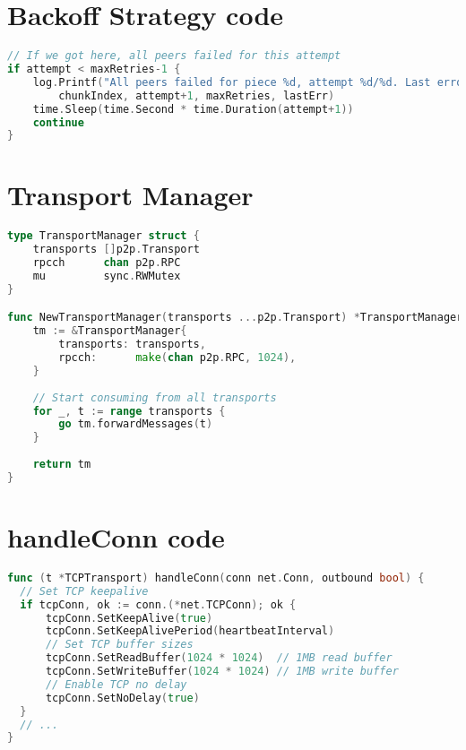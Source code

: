 \documentclass[12pt,a4paper]{report}
\begin{document}
\section{Backoff Strategy code}
\begin{lstlisting}[language=Go, caption={Backoff strategy implementation}, label={lst:backoff-strategy}]
// If we got here, all peers failed for this attempt
if attempt < maxRetries-1 {
    log.Printf("All peers failed for piece %d, attempt %d/%d. Last error: %v",
        chunkIndex, attempt+1, maxRetries, lastErr)
    time.Sleep(time.Second * time.Duration(attempt+1))
    continue
}
\end{lstlisting}

\section{Transport Manager}
\begin{lstlisting}[language=Go, caption={Transport Manager implementation}, label={lst:transport-manager}]
type TransportManager struct {
    transports []p2p.Transport
    rpcch      chan p2p.RPC
    mu         sync.RWMutex
}

func NewTransportManager(transports ...p2p.Transport) *TransportManager {
    tm := &TransportManager{
        transports: transports,
        rpcch:      make(chan p2p.RPC, 1024),
    }
    
    // Start consuming from all transports
    for _, t := range transports {
        go tm.forwardMessages(t)
    }
    
    return tm
}
\end{lstlisting}

\section{handleConn code}
\begin{lstlisting}[language=Go, caption={handleConn optimisations}, label={lst:handleConn}]
func (t *TCPTransport) handleConn(conn net.Conn, outbound bool) {
  // Set TCP keepalive
  if tcpConn, ok := conn.(*net.TCPConn); ok {
      tcpConn.SetKeepAlive(true)
      tcpConn.SetKeepAlivePeriod(heartbeatInterval)
      // Set TCP buffer sizes
      tcpConn.SetReadBuffer(1024 * 1024)  // 1MB read buffer
      tcpConn.SetWriteBuffer(1024 * 1024) // 1MB write buffer
      // Enable TCP no delay
      tcpConn.SetNoDelay(true)
  }
  // ...
}
\end{lstlisting}
\end{document}
